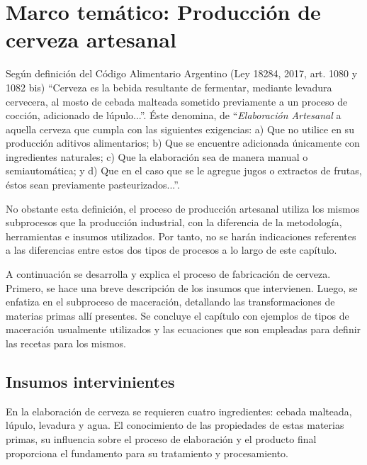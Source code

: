 \chapter{ Marco temático: Producción de cerveza artesanal}
    \label{MarcoTematico}
    \par Según definición del Código Alimentario Argentino (Ley 18284, 2017, art. 1080 y 1082 bis) “Cerveza es la bebida resultante de fermentar, mediante levadura cervecera, al mosto de cebada malteada sometido previamente a un proceso de cocción, adicionado de lúpulo...”. Éste denomina, de “\textit{Elaboración Artesanal} a aquella cerveza que cumpla con las siguientes exigencias: a) Que no utilice en su producción aditivos alimentarios; b) Que se encuentre adicionada únicamente con ingredientes naturales; c) Que la elaboración sea de manera manual o semiautomática; y d) Que en el caso que se le agregue jugos o extractos de frutas, éstos sean previamente pasteurizados...”. 
    
    \par No obstante esta definición, el proceso de producción artesanal utiliza los mismos subprocesos que la producción industrial, con la diferencia de la metodología, herramientas e insumos utilizados. Por tanto, no se harán indicaciones referentes a las diferencias entre estos dos tipos de procesos a lo largo de este capítulo. %
    
    \par A continuación se desarrolla y explica el proceso de fabricación de cerveza. Primero, se hace una breve descripción de los insumos que intervienen. Luego, se enfatiza en el subproceso de maceración, detallando las transformaciones de materias primas allí presentes. Se concluye el capítulo con ejemplos de tipos de maceración usualmente utilizados y las ecuaciones que son empleadas para definir las recetas para los mismos. %
    
    \section{Insumos intervinientes}
        \par En la elaboración de cerveza se requieren cuatro ingredientes: cebada malteada, lúpulo, levadura y agua. El conocimiento de las propiedades de estas materias primas, su influencia sobre el proceso de elaboración y el producto final proporciona el fundamento para su tratamiento  y  procesamiento.
        
